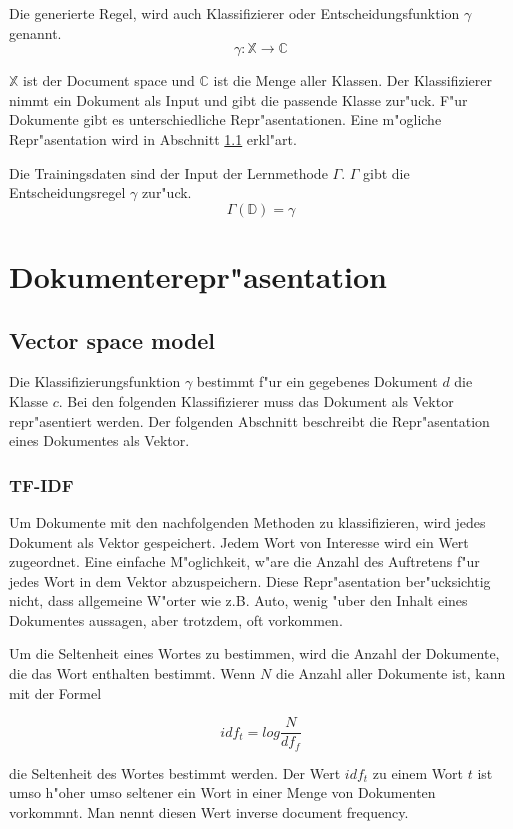 \documentclass[12pt,a4paper,twoside]{article}
\begin{document}
Die generierte Regel, wird auch Klassifizierer oder Entscheidungsfunktion $\gamma$ genannt.
\[
\gamma : \mathbb{X} \to \mathbb{C}
\]

$\mathbb{X}$ ist der Document space und $\mathbb{C}$ ist die Menge aller Klassen. Der Klassifizierer nimmt ein Dokument als Input und gibt die passende Klasse zur"uck. F"ur Dokumente gibt es unterschiedliche Repr"asentationen. Eine m"ogliche Repr"asentation wird in Abschnitt \ref{sec:vectorspacemodel} erkl"art.

Die Trainingsdaten sind der Input der Lernmethode $\Gamma$. $\Gamma$ gibt die Entscheidungsregel $\gamma$ zur"uck.
\[
\Gamma(\mathbb{D}) = \gamma
\]

\section{Dokumenterepr"asentation}
\label{sec:linearclassifiers}

\subsection{Vector space model}
\label{sec:vectorspacemodel}
Die Klassifizierungsfunktion $\gamma$ bestimmt f"ur ein gegebenes Dokument $d$ die Klasse $c$. Bei den folgenden Klassifizierer muss das Dokument als Vektor re\-pr"as\-entiert werden. Der folgenden Abschnitt beschreibt die Repr"asentation eines Dokumentes als Vektor.

\subsubsection{TF-IDF}
\label{sec:tfidf}

Um Dokumente mit den nachfolgenden Methoden zu klassifizieren, wird jedes Dokument als Vektor gespeichert. Jedem Wort von Interesse wird ein Wert zugeordnet. Eine einfache M"oglichkeit, w"are die Anzahl des Auftretens f"ur jedes Wort in dem Vektor abzuspeichern. Diese Repr"asentation ber"ucksichtig nicht, dass allgemeine W"orter wie z.B. Auto, wenig "uber den Inhalt eines Dokumentes aussagen, aber trotzdem, oft vorkommen.

Um die Seltenheit eines Wortes zu bestimmen, wird die Anzahl der Dokumente, die das Wort enthalten bestimmt. Wenn $N$ die Anzahl aller Dokumente ist, kann mit der Formel

\[
idf_t = log \frac{ N}{df_f}
\]

die Seltenheit des Wortes bestimmt werden. Der Wert $idf_t$ zu einem Wort $t$ ist umso h"oher umso seltener ein Wort in einer Menge von Dokumenten vorkommnt. Man nennt diesen Wert inverse document frequency\cite{manning08}.
\end{document}
